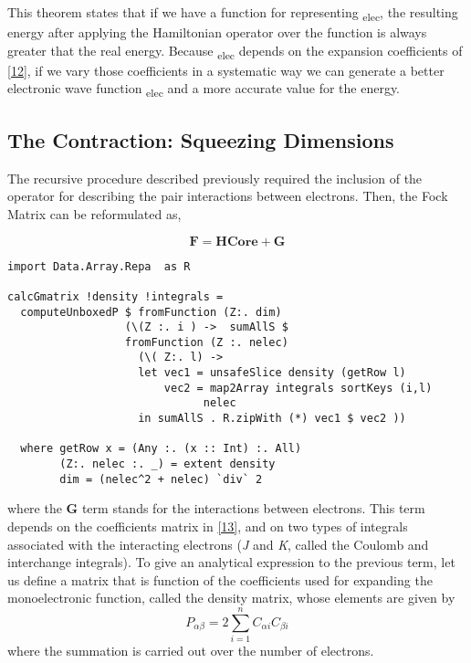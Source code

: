 \documentclass{tmr}
\begin{document}
This theorem states that if we have a function for representing \textPhi\textsubscript{elec},
the resulting energy after applying the Hamiltonian operator over the function is always greater
that the real energy. Because  \textPhi\textsubscript{elec} depends on the expansion coefficients of
\eqref{12}, if we vary those coefficients in a systematic way we can generate 
a better electronic wave function \textPhi\textsubscript{elec} and a more accurate value
for the energy.

\subsection{The Contraction: Squeezing Dimensions}

The recursive procedure described previously required the inclusion of the operator
for describing the pair interactions between electrons. Then, the Fock Matrix can
be reformulated as,

\begin{equation}\label{22}
 \mathbf{F} = \mathbf{HCore} + \mathbf{G}
\end{equation}

\begin{lstlisting}[float,captionpos=b,belowcaptionskip=4pt, caption= Computation of the  G matrix]
import Data.Array.Repa  as R

calcGmatrix !density !integrals =
  computeUnboxedP $ fromFunction (Z:. dim)
                  (\(Z :. i ) ->  sumAllS $
                  fromFunction (Z :. nelec)
                    (\( Z:. l) ->
                    let vec1 = unsafeSlice density (getRow l)
                        vec2 = map2Array integrals sortKeys (i,l)
                              nelec
                    in sumAllS . R.zipWith (*) vec1 $ vec2 ))

  where getRow x = (Any :. (x :: Int) :. All)
        (Z:. nelec :. _) = extent density
        dim = (nelec^2 + nelec) `div` 2

\end{lstlisting}

where the \textbf{G} term stands for the interactions between electrons.
This term depends on the coefficients matrix in \eqref{13},
and on two types of integrals associated with the interacting electrons 
(\textit{J} and \textit{K}, called the Coulomb and interchange integrals).
To give an analytical expression to the previous term, let us define 
a matrix that is function of the coefficients used for expanding the
monoelectronic function, called the density matrix, whose elements
are given by
\begin{equation}\label{23}
 P_{\alpha \beta} = 2\sum^{n}_{i=1} C_{\alpha i} C_{\beta i}
\end{equation}
where the summation is carried out over the number of electrons.
\end{document}
